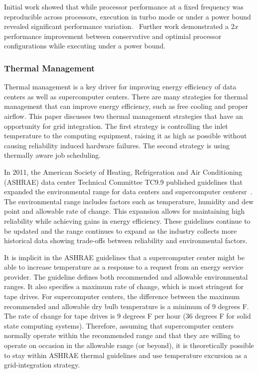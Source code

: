 Initial work showed that while processor performance at a fixed frequency 
was reproducible across processors, execution in turbo mode or under a power
bound revealed significant performance variation.~\cite{Rountree2012} Further
work demonstrated a $2x$ performance improvement between conservative and
optimial processor configurations while executing under a power bound.~\cite{Patki1}


\subsubsection{Thermal Management}

Thermal management is a key driver for improving energy efficiency of data
centers as well as supercomputer centers.  There are many strategies for thermal
management that can improve energy efficiency, such as free cooling and proper
airflow.  This paper discusses two thermal management strategies that have an
opportunity for grid integration.  The first strategy is controlling the inlet
temperature to the computing equipment, raising it as high as possible without
causing reliability induced hardware failures.  The second strategy is using
thermally aware job scheduling.

In 2011, the American Society of Heating, Refrigeration and Air Conditioning
(ASHRAE) data center Technical Committee TC9.9 published guidelines that
expanded the environmental range for data centers and supercomputer
centersr~\cite{ASHRAE:tgfdpe}.  The environmental range includes factors such as temperature, humidity
and dew point and allowable rate of change.  This expansion allows for
maintaining high reliability while achieving gains in energy efficiency.  These
guidelines continue to be updated and the range continues to expand as the
industry collects more historical data showing trade-offs between reliability
and environmental factors.

It is implicit in the ASHRAE guidelines that a supercomputer center might be
able to increase temperature as a response to a request from an energy service
provider.  The guideline defines both recommended and
allowable environmental ranges.  It also specifies a maximum rate of
change, which is most stringent for tape drives.  For supercomputer centers, the
difference between the maximum recommended and allowable dry bulb temperature is
a minimum of 9 degrees F.  The rate of change for tape drives is 9 degrees F per
hour (36 degrees F for solid state computing systems).   Therefore, assuming
that supercomputer centers normally operate within the recommended range and
that they are willing to operate on occasion in the allowable range (or beyond),
it is theoretically possible to stay within ASHRAE thermal guidelines and use
temperature excursion as a grid-integration strategy.  

